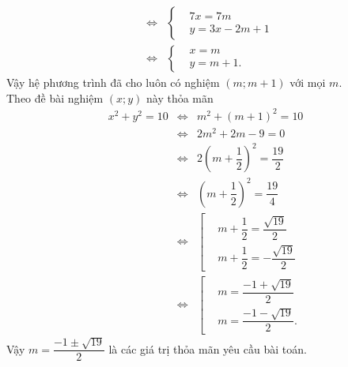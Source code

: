 \begin{ex}
{\begin{enumerate}
\begin{eqnarray*}
			 &\Leftrightarrow &\left\{\begin{aligned}&7x=7m \\&y=3x-2m+1\end{aligned}\right.\\
			 &\Leftrightarrow &\left\{\begin{aligned}&x=m \\&y=m+1.\end{aligned}\right.
			\end{eqnarray*}
			Vậy hệ phương trình đã cho luôn có nghiệm $(m;m+1)$ với mọi $m$.\\
			Theo đề bài nghiệm $(x;y)$ này thỏa mãn
			\begin{eqnarray*}
			 x^2+y^2=10 & \Leftrightarrow & m^2+(m+1)^2=10\\
			 &\Leftrightarrow & 2m^2+2m-9=0 \\
			 &\Leftrightarrow & 2\left(m+\dfrac{1}{2}\right)^2=\dfrac{19}{2}\\
			 &\Leftrightarrow & \left(m+\dfrac{1}{2}\right)^2=\dfrac{19}{4}\\
			 &\Leftrightarrow & \left[\begin{aligned}&m+\dfrac{1}{2}=\dfrac{\sqrt{19}}{2} \\&m+\dfrac{1}{2}=-\dfrac{\sqrt{19}}{2}\end{aligned}\right.\\
			 &\Leftrightarrow & \left[\begin{aligned}&m=\dfrac{-1+\sqrt{19}}{2} \\&m=\dfrac{-1-\sqrt{19}}{2}.\end{aligned}\right.
			\end{eqnarray*}
			Vậy $m=\dfrac{-1\pm\sqrt{19}}{2}$ là các giá trị thỏa mãn yêu cầu bài toán.
		\end{enumerate}
	}
\end{ex}

